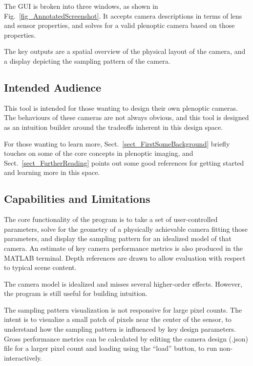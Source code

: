 \documentclass[onecolumn]{article}
\begin{document}
The GUI is broken into three windows, as shown in Fig.~\ref{fig_AnnotatedScreenshot}.  It accepts camera descriptions in terms of lens and sensor properties, and solves for a valid plenoptic camera based on those properties.

The key outputs are a spatial overview of the physical layout of the camera, and a display depicting the sampling pattern of the camera.

\subsection{Intended Audience}

This tool is intended for those wanting to design their own plenoptic cameras.  The behaviours of these cameras are not always obvious, and this tool is designed as an intuition builder around the tradeoffs inherent in this design space.  

For those wanting to learn more, Sect.~\ref{sect_FirstSomeBackground} briefly touches on some of the core concepts in plenoptic imaging, and Sect.~\ref{sect_FurtherReading} points out some good references for getting started and learning more in this space.

\subsection{Capabilities and Limitations}

The core functionality of the program is to take a set of user-controlled parameters, solve for the geometry of a physically achievable camera fitting those parameters, and display the sampling pattern for an idealized model of that camera.  An estimate of key camera performance metrics is also produced in the MATLAB terminal.  Depth references are drawn to allow evaluation with respect to typical scene content.

The camera model is idealized and misses several higher-order effects.  However, the program is still useful for building intuition.

The sampling pattern visualization is not responsive for large pixel counts.  The intent is to visualize a small patch of pixels near the center of the sensor, to understand how the sampling pattern is influenced by key design parameters.  Gross performance metrics can be calculated by editing the camera design (.json) file for a larger pixel count and loading using the ``load'' button, to run non-interactively.
\end{document}
